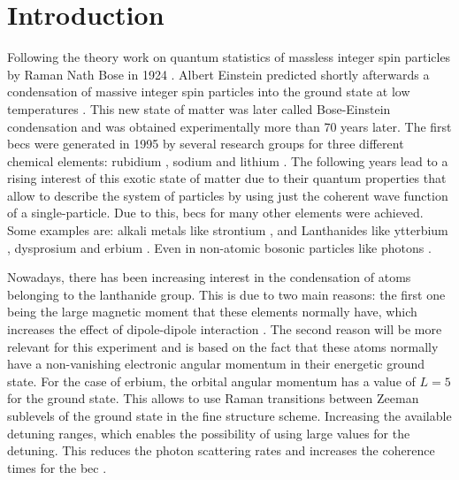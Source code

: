 
\chapter{Introduction}
\label{chap:intro}

Following the theory work on quantum statistics of massless integer spin particles by Raman Nath Bose in 1924 \cite{Bose1924}. Albert Einstein predicted shortly afterwards a condensation of massive integer spin particles into the ground state at low temperatures \cite{Einstein1924, Einstein1925}. This new state of matter was later called Bose-Einstein condensation and was obtained experimentally more than 70 years later. The first \acp{bec} were generated in 1995 by several research groups for three different chemical elements: rubidium \cite{Davis1995}, sodium \cite{Anderson1995} and lithium \cite{Bradley1995}. The following years lead to a rising interest of this exotic state of matter due to their quantum properties that allow to describe the system of particles by using just the coherent wave function of a single-particle. Due to this, \acp{bec} for many other elements were achieved. Some examples are: alkali metals like strontium \cite{Stellmer2009}, and Lanthanides like ytterbium \cite{Takasu2003}, dysprosium \cite{Lu2011} and erbium \cite{Aikawa2012}. Even in non-atomic bosonic particles like photons \cite{Klaers2010}.

Nowadays, there has been increasing interest in the condensation of atoms belonging to the lanthanide group. This is due to two main reasons: the first one being the large magnetic moment that these elements normally have, which increases the effect of dipole-dipole interaction \cite{Aikawa2012,Baier2018}. The second reason will be more relevant for this experiment and is based on the fact that these atoms normally have a non-vanishing electronic angular momentum in their energetic ground state. For the case of erbium, the orbital angular momentum has a value of $L=5$ for the ground state. This allows to use Raman transitions between Zeeman sublevels of the ground state in the fine structure scheme. Increasing the available detuning ranges, which enables the possibility of using large values for the detuning. This reduces the photon scattering rates and increases the coherence times for the \ac{bec} \cite{Grimm2000}.

